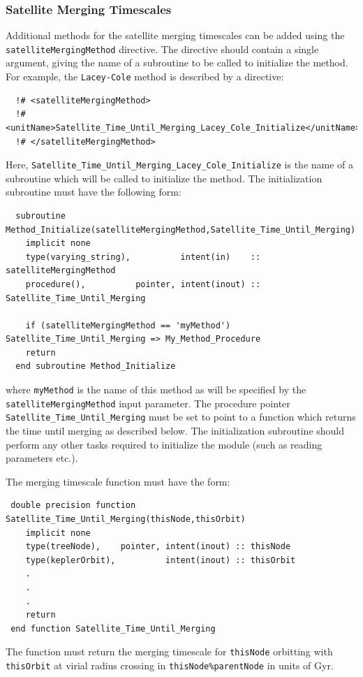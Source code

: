 \subsubsection{Satellite Merging Timescales}

Additional methods for the satellite merging timescales can be added using the {\tt satelliteMergingMethod} directive. The directive should contain a single argument, giving the name of a subroutine to be called to initialize the method. For example, the {\tt Lacey-Cole} method is described by a directive:
\begin{verbatim}
  !# <satelliteMergingMethod>
  !#  <unitName>Satellite_Time_Until_Merging_Lacey_Cole_Initialize</unitName>
  !# </satelliteMergingMethod>
\end{verbatim}
Here, {\tt Satellite\_Time\_Until\_Merging\_Lacey\_Cole\_Initialize} is the name of a subroutine which will be called to initialize the method. The initialization subroutine must have the following form:
\begin{verbatim}
  subroutine Method_Initialize(satelliteMergingMethod,Satellite_Time_Until_Merging)
    implicit none
    type(varying_string),          intent(in)    :: satelliteMergingMethod
    procedure(),          pointer, intent(inout) :: Satellite_Time_Until_Merging
    
    if (satelliteMergingMethod == 'myMethod') Satellite_Time_Until_Merging => My_Method_Procedure
    return
  end subroutine Method_Initialize
\end{verbatim}
where {\tt myMethod} is the name of this method as will be specified by the {\tt satelliteMergingMethod} input parameter. The procedure pointer {\tt Satellite\_Time\_Until\_Merging} must be set to point to a function which returns the time until merging as described below. The initialization subroutine should perform any other tasks required to initialize the module (such as reading parameters etc.).

The merging timescale function must have the form:
\begin{verbatim}
 double precision function Satellite_Time_Until_Merging(thisNode,thisOrbit)
    implicit none
    type(treeNode),    pointer, intent(inout) :: thisNode
    type(keplerOrbit),          intent(inout) :: thisOrbit
    .
    .
    .
    return
 end function Satellite_Time_Until_Merging
\end{verbatim}
The function must return the merging timescale for {\tt thisNode} orbitting with {\tt thisOrbit} at virial radius crossing in {\tt thisNode\%parentNode} in units of Gyr.

